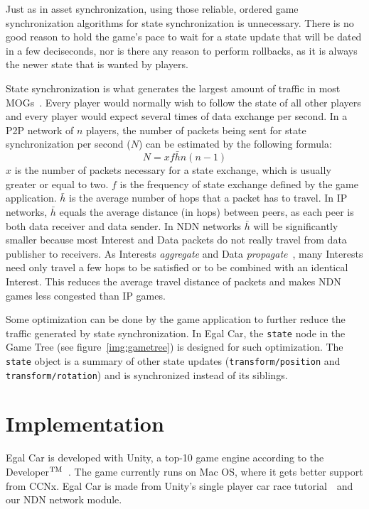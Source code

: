 \documentclass{article}
\def\tm{\leavevmode\hbox{$\rm {}^{TM}$}} %
\begin{document}
Just as in asset synchronization, using those reliable, ordered game synchronization algorithms for state synchronization is unnecessary. There is no good reason to hold the game's pace to wait for a state update that will be dated in a few deciseconds, nor is there any reason to perform rollbacks, as it is always the newer state that is wanted by players.

State synchronization is what generates the largest amount of traffic in most MOGs~\cite{Upen}. Every player would normally wish to follow the state of all other players and every player would expect several times of data exchange per second. In a P2P network of $n$ players, the number of packets being sent for state synchronization per second ($N$) can be estimated by the following formula:
\begin{equation}
N = xf\bar{h}n(n-1)
\end{equation}
$x$ is the number of packets necessary for a state exchange, which is usually greater or equal to two. $f$ is the frequency of state exchange defined by the game application. $\bar{h}$ is the average number of hops that a packet has to travel. In IP networks, $\bar{h}$ equals the average distance (in hops) between peers, as each peer is both data receiver and data sender. In NDN networks $\bar{h}$ will be significantly smaller because most Interest and Data packets do not really travel from data publisher to receivers. As Interests \emph{aggregate} and Data \emph{propagate}~\cite{Jndn}, many Interests need only travel a few hops to be satisfied or to be combined with an identical Interest. This reduces the average travel distance of packets and makes NDN games less congested than IP games.

Some optimization can be done by the game application to further reduce the traffic generated by state synchronization. In Egal Car, the \texttt{state} node in the Game Tree (see figure~\ref{img:gametree}) is designed for such optimization. The \texttt{state} object is a summary of other state updates (\texttt{transform/position} and \texttt{transform/rotation}) and is synchronized instead of its siblings.


\section{Implementation}
\label{implementation}

Egal Car is developed with Unity, a top-10 game engine according to the Developer\tm~\cite{unityrank}. The game currently runs on Mac OS, where it gets better support from CCNx. Egal Car is made from Unity's single player car race tutorial~\cite{UnityCar}~and our NDN network module.
\end{document}
